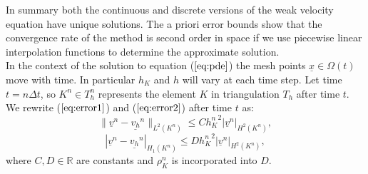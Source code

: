 \documentclass[11pt]{article}
\newcommand{\D}{\Delta}
\newcommand{\ul}{\underline}
\newcommand{\Om}{\Omega}
\begin{document}
In summary both the continuous and discrete versions of the weak velocity equation have unique solutions. The a priori error bounds show that the convergence rate of the method is second order in space if we use piecewise linear interpolation functions to determine the approximate solution. \\
In the context of the solution to equation ($\ref{eq:pde}$) the mesh points $\ul{x}\in \Om(t)$ move with time. In particular $h_K$ and $h$ will vary at each time step. Let time $t = n\D{t}$, so $K^n \in T_h^n$ represents the element $K$ in triangulation $T_h$ after time $t$. We rewrite ($\ref{eq:error1}$) and ($\ref{eq:error2}$) after time $t$ as:
\begin{equation}
\label{eq:error3_1}
\|\ul{v}^n-\ul{v_h}^n\|_{L^2(K^n)} \leq C{h_K^n}^2|\ul{v}^n|_{H^2(K^n)},
\end{equation}
\begin{equation}
\label{eq:error4_1}
|\ul{v}^n-\ul{v_h}^n|_{H_1(K^n)} \leq D{h_K^n}^2|\ul{v}^n|_{H^2(K^n)},
\end{equation}
where $C, D \in \mathbb{R}$ are constants and $\rho_K^n$ is incorporated into $D$.
\end{document}

